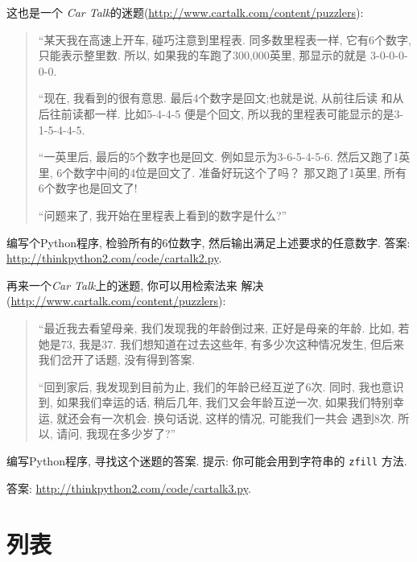 \documentclass[10pt]{book}
\begin{document}
\begin{exercise}
这也是一个 {\em Car Talk}的迷题(\url{http://www.cartalk.com/content/puzzlers}):

\begin{quote}

``某天我在高速上开车, 碰巧注意到里程表. 
同多数里程表一样, 它有6个数字, 只能表示整里数. 
所以, 如果我的车跑了300,000英里, 那显示的就是
3-0-0-0-0-0.

``现在, 我看到的很有意思. 最后4个数字是回文;也就是说, 从前往后读
和从后往前读都一样. 比如5-4-4-5 便是个回文, 
所以我的里程表可能显示的是3-1-5-4-4-5.

``一英里后, 最后的5个数字也是回文. 
例如显示为3-6-5-4-5-6. 然后又跑了1英里, 6个数字中间的4位是回文了. 
准备好玩这个了吗？ 那又跑了1英里, 所有6个数字也是回文了!

``问题来了, 我开始在里程表上看到的数字是什么?''
\end{quote}

编写个Python程序, 检验所有的6位数字, 然后输出满足上述要求的任意数字. 
答案: \url{http://thinkpython2.com/code/cartalk2.py}.

\end{exercise}


\begin{exercise}
再来一个{\em Car Talk}上的迷题, 你可以用检索法来
解决(\url{http://www.cartalk.com/content/puzzlers}):

\begin{quote}
``最近我去看望母亲, 我们发现我的年龄倒过来, 正好是母亲的年龄. 
比如, 若她是73, 我是37. 我们想知道在过去这些年, 有多少次这种情况发生, 
但后来我们岔开了话题, 没有得到答案. 

``回到家后, 我发现到目前为止, 我们的年龄已经互逆了6次. 
同时, 我也意识到, 如果我们幸运的话, 稍后几年, 我们又会年龄互逆一次, 
如果我们特别幸运, 就还会有一次机会. 换句话说, 这样的情况, 可能我们一共会
遇到8次. 所以, 请问, 我现在多少岁了?''

\end{quote}

编写Python程序, 寻找这个迷题的答案. 
提示: 你可能会用到字符串的 {\tt zfill} 方法. 

答案: \url{http://thinkpython2.com/code/cartalk3.py}.

\end{exercise}



\chapter{列表}
\end{document}
